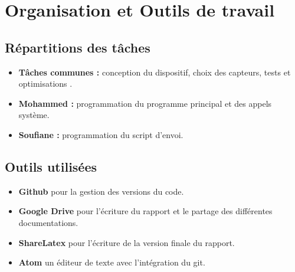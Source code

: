 \section{Organisation et Outils de travail}   
    \subsection{Répartitions des tâches}
        \begin{itemize}
            \item \textbf{Tâches communes : }conception du dispositif, choix des capteurs, tests et optimisations .
            \item \textbf{Mohammed : }programmation du programme principal et des appels système.
            \item \textbf{Soufiane : }programmation du script d'envoi.
        \end{itemize}
    \subsection{Outils utilisées}
    \begin{itemize}
      \item \textbf{Github} pour la gestion des versions du code.
      \item \textbf{Google Drive} pour l'écriture du rapport et le partage des différentes documentations.
      \item \textbf{ShareLatex} pour l'écriture de la version finale du rapport.
      \item \textbf{Atom} un éditeur de texte avec l'intégration du git.
    \end{itemize}